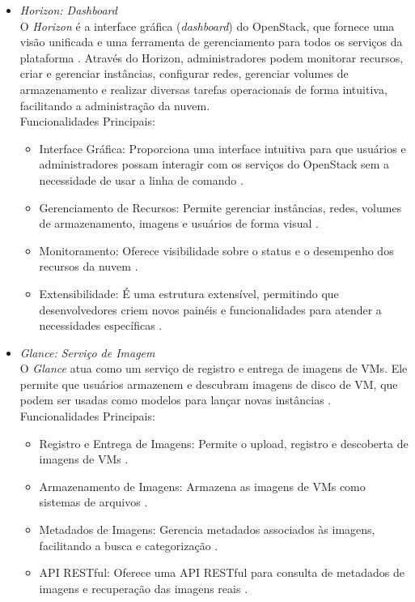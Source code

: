 \begin{itemize}
\begin{itemize}
    \item \emph{Horizon: Dashboard}\\
    O \textit{Horizon} é a interface gráfica (\textit{dashboard}) do OpenStack, que fornece uma visão unificada e uma ferramenta de gerenciamento para todos os serviços da plataforma \cite{openstack_horizon}. Através do Horizon, administradores podem monitorar recursos, criar e gerenciar instâncias, configurar redes, gerenciar volumes de armazenamento e realizar diversas tarefas operacionais de forma intuitiva, facilitando a administração da nuvem.\\
    Funcionalidades Principais:
    \begin{itemize}
        \item Interface Gráfica: Proporciona uma interface intuitiva para que usuários e administradores possam interagir com os serviços do OpenStack sem a necessidade de usar a linha de comando \cite{openstack_horizon}.
        \item Gerenciamento de Recursos: Permite gerenciar instâncias, redes, volumes de armazenamento, imagens e usuários de forma visual \cite{openstack_horizon}.
        \item Monitoramento: Oferece visibilidade sobre o status e o desempenho dos recursos da nuvem \cite{openstack_horizon}.
        \item Extensibilidade: É uma estrutura extensível, permitindo que desenvolvedores criem novos painéis e funcionalidades para atender a necessidades específicas \cite{openstack_horizon}.
    \end{itemize}

    \item \emph{Glance: Serviço de Imagem}\\
    O \textit{Glance} atua como um serviço de registro e entrega de imagens de VMs. Ele permite que usuários armazenem e descubram imagens de disco de VM, que podem ser usadas como modelos para lançar novas instâncias \cite{openstack_glance}.\\
    Funcionalidades Principais:
    \begin{itemize}
        \item Registro e Entrega de Imagens: Permite o upload, registro e descoberta de imagens de VMs \cite{openstack_glance}.
        \item Armazenamento de Imagens: Armazena as imagens de VMs como sistemas de arquivos \cite{openstack_glance}.
        \item Metadados de Imagens: Gerencia metadados associados às imagens, facilitando a busca e categorização \cite{openstack_glance}.
        \item API RESTful: Oferece uma API RESTful para consulta de metadados de imagens e recuperação das imagens reais \cite{openstack_glance}.
    \end{itemize}


\end{itemize}
\end{itemize}
